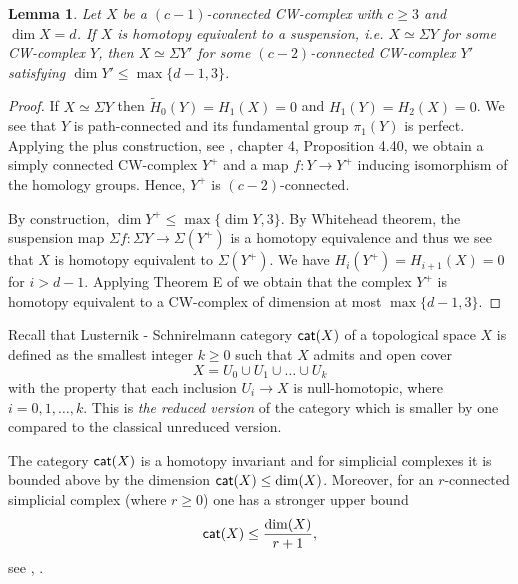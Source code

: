 \documentclass[10pt,a4paper]{amsart}
\newtheorem{lema}{Lemma}
\newcommand{\cat}{{\sf{cat}}}
\begin{document}
\begin{lema}\label{lm1b}
Let $X$ be a $(c-1)$-connected CW-complex with $c\ge 3$ and $\dim X = d$. 
If $X$ is homotopy equivalent to a suspension, i.e. $X\simeq \Sigma Y$ for some CW-complex $Y$, 
then $X\simeq \Sigma Y'$ for some $(c-2)$-connected
CW-complex $Y'$ satisfying 
$\dim Y'\le \max\{d-1, 3\}$. 
\end{lema}
\begin{proof}
If $X\simeq \Sigma Y$ then $\tilde H_0(Y)= H_1(X)=0$ and $H_1(Y)= H_2(X)=0$. We see that $Y$ is path-connected and its fundamental group 
$\pi_1(Y)$ is perfect. Applying the plus construction, see \cite{Hatcher}, chapter 4, Proposition 4.40, we obtain a simply connected CW-complex 
$Y^+$ and a map $f: Y\to Y^+$ inducing isomorphism of the homology groups. Hence, $Y^+$ is $(c-2)$-connected. 

By construction, $\dim Y^+\le \max\{\dim Y, 3\}$. 
By Whitehead theorem, the suspension map $\Sigma f: \Sigma Y\to \Sigma (Y^+)$ is a homotopy equivalence and thus we see that $X$ is homotopy equivalent to $\Sigma (Y^+)$. We have $H_i(Y^+)=H_{i+1}(X)=0$ for $i>d-1$. Applying Theorem E of \cite{Wall} we obtain that the complex $Y^+$ is homotopy equivalent to a CW-complex of dimension at most $\max\{d-1, 3\}$. 
\end{proof}

Recall that  Lusternik - Schnirelmann category $\cat(X)$ of a topological space $X$ 
is defined as the smallest integer $k\ge 0$ such that $X$ admits and open cover 
$$X=U_0\cup U_1\cup \dots\cup U_k$$ with the property that each inclusion $U_i\to X$ is null-homotopic, where $i=0, 1, \dots, k$.  
This is {\it the reduced version} of the category which is smaller by one compared to the classical unreduced version. 

The category $\cat(X)$ is a homotopy invariant and for simplicial complexes it is bounded above by the dimension $\cat(X)\le \dim(X)$. Moreover, for an $r$-connected simplicial complex (where $r\ge 0$) one has a stronger upper bound
\begin{eqnarray}\label{dimupper}
\cat(X) \le \frac{\dim(X)}{r+1},
\end{eqnarray}
see \cite{Gro}, \cite{CLOT}. 
\end{document}
